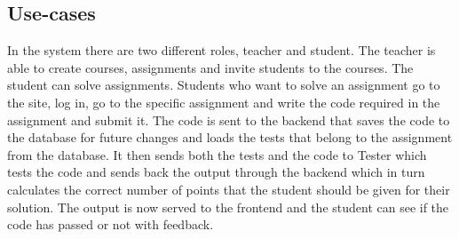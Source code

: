 \documentclass[a4paper,12pt]{article}
\begin{document}
\subsection{Use-cases}
In the system there are two different roles, teacher and student. The teacher is able to create courses, assignments and invite students to the courses. The student can solve assignments.
Students who want to solve an assignment go to the site, log in, go to the specific assignment and write the code required in the assignment and submit it. The code is sent to the backend that saves the code to the database for future changes and loads the tests that belong to the assignment from the database. It then sends both the tests and the code to Tester which tests the code and sends back the output through the backend which in turn calculates the correct number of points that the student should be given for their solution. The output is now served to the frontend and the student can see if the code has passed or not with feedback.
\end{document}
